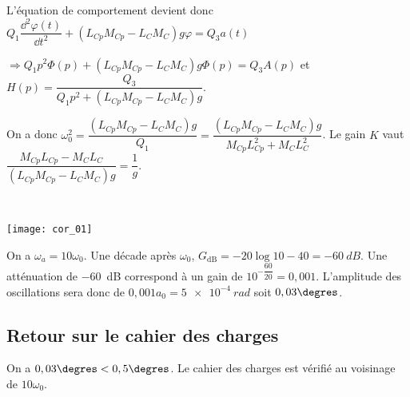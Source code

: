 \begin{multicols}{2}
\begin{corrige}
L'équation de comportement devient donc  $Q_1\dfrac{\dd^2\varphi(t) }{\dd t^2}+\left(   L_{Cp}M_{Cp} - L_CM_C \right)g  \varphi=Q_3a(t)$ 

$ \Rightarrow Q_1 p^2 \Phi(p) + \left(   L_{Cp}M_{Cp} - L_CM_C \right)g  \Phi(p)=Q_3A(p)$ et $H(p)=\dfrac{Q_3}{ Q_1 p^2  + \left(   L_{Cp}M_{Cp} - L_CM_C \right)g  }$.

On a donc $\omega_0^2 = \dfrac{\left(   L_{Cp}M_{Cp} - L_CM_C \right)g }{Q_1}=\dfrac{\left(   L_{Cp}M_{Cp} - L_CM_C \right)g }{ M_{Cp}L_{Cp}^2+M_{C}L_{C}^2}$. 
Le gain $K$ vaut $\dfrac{M_{Cp}L_{Cp}- M_CL_C}{\left(   L_{Cp}M_{Cp} - L_CM_C \right)g}=\dfrac{1}{g}$.
\end{corrige}
\else
\fi

\ifprof
\begin{corrige}~\\

\begin{center}
\texttt{[image: cor\_01]}
\end{center}
\end{corrige}
\else
\fi


\ifprof
\begin{corrige}
On a $\omega_a=10\omega_0$. Une décade après $\omega_0$, $G_{\text{dB}}=-20\log 10 - 40 = \SI{-60}{dB}$. Une atténuation de \SI{-60}{dB} correspond à un gain de $10^{-\dfrac{60}{20}}=0,001$. L'amplitude des oscillations sera donc de $0,001 a_0 = \SI{5e-4}{rad}$ soit $0,03 \degres$.


\end{corrige}
\else
\fi


\subsection*{Retour sur le cahier des charges}

\ifprof
\begin{corrige}
On a $0,03 \degres < 0,5\degres$. Le cahier des charges est vérifié au voisinage de $10\omega_0$.
\end{corrige}
\else
\fi




\end{multicols}
